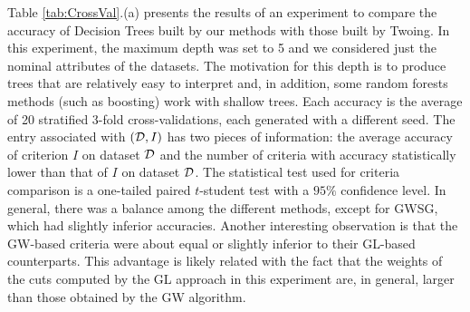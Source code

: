 Table \ref{tab:CrossVal}.(a) presents  the results of an experiment to
compare the accuracy of  Decision Trees built by  our methods with those built by Twoing.
In this experiment, the maximum depth was set to 5 and we considered just the nominal attributes of the datasets. 
The motivation for this depth is to produce trees that
are relatively easy to interpret and, in addition, some random
forests methods (such as boosting) work with shallow trees.
Each accuracy is the average of 20 stratified 3-fold cross-validations,
each generated with a different seed.
The entry  associated with  $({\cal D},I)$ has two pieces of information: the average accuracy
of criterion $I$ on dataset ${\cal D}$ and the number of criteria
with accuracy   statistically lower than that of $I$ on dataset ${\cal D}$. 
The statistical test used for criteria comparison is a  one-tailed paired $t$-student test with a $95\% $ confidence level. 
In general, there was a balance among the different methods,
except for GWSG, which had slightly inferior accuracies. Another interesting observation is that the GW-based criteria were
about equal or slightly inferior to their GL-based counterparts. This advantage is likely related with the fact that the weights of
the cuts computed by the GL approach in this experiment are, in general, larger than those obtained by the GW algorithm.



